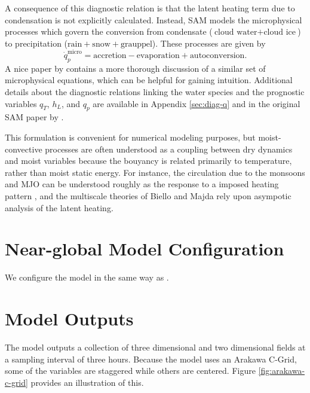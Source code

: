 \documentclass{report}
\begin{document}
A consequence of this diagnostic relation is that the latent
heating term due to condensation is not explicitly calculated. Instead, SAM
models the microphysical processes which govern the conversion from condensate
($\text{cloud water} + \text{cloud ice}$) to precipitation ($\text{rain} +
\text{snow} + \text{grauppel}$). These processes are given by
\[
  \dot{q}_p^{\text{micro}} = \text{accretion} - \text{evaporation} + \text{autoconversion}.
\]
A nice paper by \textcite{hernandez-duenas_minimal_2013} contains a more thorough
discussion of a similar set of microphysical equations, which can be helpful for
gaining intuition. Additional details about the diagnostic relations linking the
water species and the prognostic variables $q_T$, $h_L$, and $q_p$ are available
in Appendix \ref{sec:diag-q} and in the original SAM paper by \textcite{Khairoutdinov2003}.

This formulation is convenient for numerical modeling purposes, but
moist-convective processes are often understood as a coupling between dry
dynamics and moist variables because the bouyancy is related primarily to
temperature, rather than moist static energy.
For instance, the circulation due to the monsoons and MJO can be understood
roughly as the response to a imposed heating pattern \autocite{Gill1980}, and
the multiscale theories of Biello and Majda rely upon asympotic analysis of the
latent heating.

\section{Near-global Model Configuration}
\label{sec:model-config}

We configure the model in the same way as \textcite{Bretherton2015}. 

\section{Model Outputs}

The model outputs a collection of three dimensional and two dimensional fields
at a sampling interval of three hours. 
Because the model uses an Arakawa C-Grid, some of the variables are staggered
while others are centered. 
Figure \ref{fig:arakawa-c-grid} provides an illustration of this.
\end{document}
